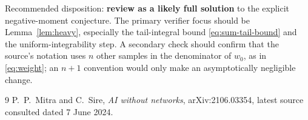 \documentclass[11pt]{article}
\begin{document}
Recommended disposition: \textbf{review as a likely full solution} to the
explicit negative-moment conjecture.  The primary verifier focus should be
Lemma~\ref{lem:heavy}, especially the tail-integral bound
\eqref{eq:sum-tail-bound} and the uniform-integrability step.  A secondary
check should confirm that the source's notation uses $n$ other samples in
the denominator of $w_0$, as in \eqref{eq:weight}; an $n+1$ convention would
only make an asymptotically negligible change.

\begin{thebibliography}{9}
P.~P.~Mitra and C.~Sire,
\emph{AI without networks},
arXiv:2106.03354, latest source consulted dated 7 June 2024.
\end{thebibliography}
\end{document}
